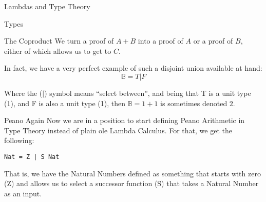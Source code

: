 \begin{part}{Lambdas and Type Theory}
\begin{chapter}{Types}
\begin{section}{The Coproduct}
            We turn a proof of $A + B$ into a proof of $A$ or a proof of $B$, either of which allows us to get to $C$.
            
            In fact, we have a very perfect example of such a disjoint union available at hand:
            $$
                \mathbb{B} = T \vert F
            $$
            
            Where the ($\vert$) symbol means ``select between'', and being that T is a unit type (1), and F is also a unit type (1), then $\mathbb{B} = 1 + 1$ is sometimes denoted $2$.
        \end{section}
        \begin{section}{Peano Again}
            Now we are in a position to start defining Peano Arithmetic in Type Theory instead of plain ole Lambda Calculus. For that, we get the following:
            
            \begin{lstlisting}[language=Lambda]
                Nat = Z | S Nat
            \end{lstlisting}
            
            That is, we have the Natural Numbers defined as something that starts with zero (Z) and allows us to select a successor function (S) that takes a Natural Number as an input.
        \end{section}
    \end{chapter}
\end{part}